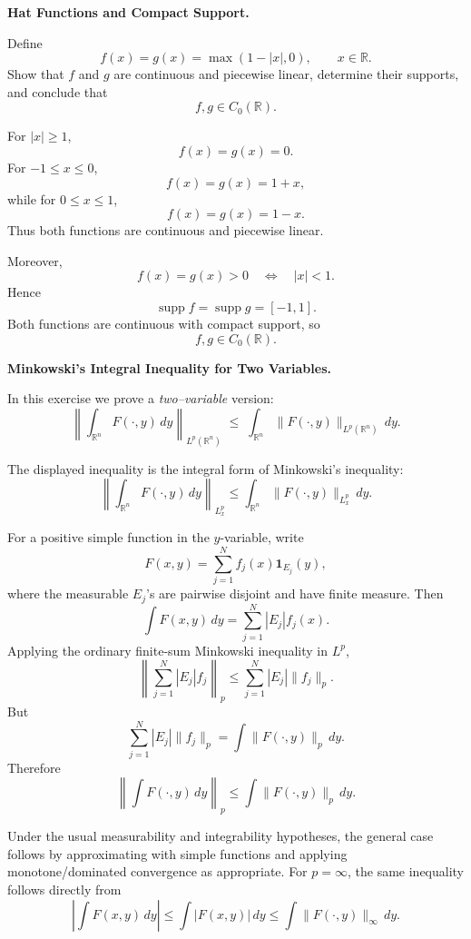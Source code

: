 \begin{problem}[CP-II-0003]
\label{prob:cp-ii-0003}
\textbf{Hat Functions and Compact Support.}

\hspace*{1.5em}Define
\[
f(x)=g(x)=\max(1-|x|,0),
\qquad x\in\mathbb R.
\]
Show that \(f\) and \(g\) are continuous and piecewise linear, determine
their supports, and conclude that
\[
f,g\in C_0(\mathbb R).
\]
\end{problem}

\begin{solution}
For \(|x|\ge1\),
\[
f(x)=g(x)=0.
\]
For \(-1\le x\le0\),
\[
f(x)=g(x)=1+x,
\]
while for \(0\le x\le1\),
\[
f(x)=g(x)=1-x.
\]
Thus both functions are continuous and piecewise linear.

Moreover,
\[
f(x)=g(x)>0
\quad\Longleftrightarrow\quad
|x|<1.
\]
Hence
\[
\operatorname{supp}f
=
\operatorname{supp}g
=
[-1,1].
\]
Both functions are continuous with compact support, so
\[
\boxed{f,g\in C_0(\mathbb R).}
\]
\end{solution}


\begin{problem}[CP-II-0004]
\label{prob:cp-ii-0004}
\textbf{Minkowski's Integral Inequality for Two Variables.}

\hspace*{1.5em}In this exercise we prove a \emph{two--variable} version:
	\[
	\left\|
	\int_{\mathbb{R}^n} F(\cdot,y)\,dy
	\right\|_{L^p(\mathbb{R}^n)}
	\;\le\;
	\int_{\mathbb{R}^n}
	\|F(\cdot,y)\|_{L^p(\mathbb{R}^n)}\,dy.
	\]
\end{problem}

\begin{solution}
The displayed inequality is the integral form of Minkowski's inequality:
\[
\left\|
\int_{\mathbb R^n}F(\cdot,y)\,dy
\right\|_{L^p_x}
\le
\int_{\mathbb R^n}
\|F(\cdot,y)\|_{L^p_x}\,dy.
\]

For a positive simple function in the \(y\)-variable, write
\[
F(x,y)
=
\sum_{j=1}^{N}
f_j(x)\mathbf1_{E_j}(y),
\]
where the measurable \(E_j\)'s are pairwise disjoint and have finite measure. Then
\[
\int F(x,y)\,dy
=
\sum_{j=1}^{N}|E_j|f_j(x).
\]
Applying the ordinary finite-sum Minkowski inequality in \(L^p\),
\[
\left\|
\sum_{j=1}^{N}|E_j|f_j
\right\|_p
\le
\sum_{j=1}^{N}
|E_j|\|f_j\|_p.
\]
But
\[
\sum_{j=1}^{N}
|E_j|\|f_j\|_p
=
\int
\|F(\cdot,y)\|_p\,dy.
\]
Therefore
\[
\boxed{
\left\|
\int F(\cdot,y)\,dy
\right\|_p
\le
\int
\|F(\cdot,y)\|_p\,dy.
}
\]

Under the usual measurability and integrability hypotheses, the general case follows by
approximating with simple functions and applying monotone/dominated convergence as
appropriate. For \(p=\infty\), the same inequality follows directly from
\[
\left|
\int F(x,y)\,dy
\right|
\le
\int |F(x,y)|\,dy
\le
\int \|F(\cdot,y)\|_\infty\,dy.
\]
\end{solution}


